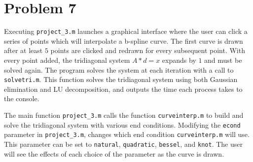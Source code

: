 \documentclass[paper=a4, fontsize=11pt]{scrartcl} %
\begin{document}
\section*{Problem 7}
\setcounter{section}{7}
\setcounter{subsection}{1}

Executing \texttt{project\_3.m} launches a graphical interface where the user
can click a series of points which will interpolate a b-spline curve. The first
curve is drawn after at least $5$ points are clicked and redrawn for every
subsequent point. With every point added, the tridiagonal system $A*d = x$
expands by $1$ and must be solved again. The program solves the system at
each iteration with a call to \texttt{solvetri.m}. This function solves 
the tridiagonal system using both Gaussian elimination and LU decomposition,
and outputs the time each process takes to the console.

\bigskip
The main function \texttt{project\_3.m} calls the function
\texttt{curveinterp.m} to build and solve the tridiagonal system with various
end conditions. Modifying the \texttt{econd} parameter in
\texttt{project\_3.m}, changes which end condition \texttt{curveinterp.m} will
use. This parameter can be set to \texttt{natural}, \texttt{quadratic},
\texttt{bessel}, and \texttt{knot}. The user will see the effects of each
choice of the parameter as the curve is drawn.
\end{document}
